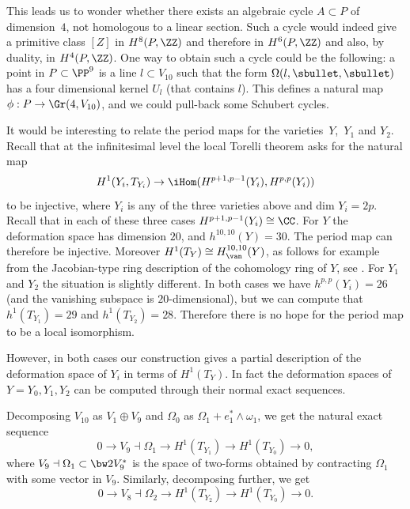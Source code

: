 This leads us to wonder whether there exists an algebraic cycle $A \subset P$ of dimension~$4$, not homologous to a linear section. Such a cycle would indeed give a primitive class
$[Z]$ in $H^8(P,\ZZ)$ and therefore in $H^6(P,\ZZ)$ and also, by duality, in $H^4(P,\ZZ)$.
One way to obtain such a cycle could be the following: a point in $P \subset \PP^9$ is a line
$l \subset V_{10}$ such that the form $\Omega(l,\sbullet,\sbullet)$ has a four dimensional
kernel $U_l$ (that contains $l$). This defines a natural map $\phi: P \to \Gr(4,V_{10})$,
and we could pull-back some Schubert cycles.

\begin{remark}
It would be interesting to relate the period maps for the varieties~$Y$,~$Y_1$ and $Y_2$.
Recall that at the infinitesimal level the local Torelli theorem asks for the natural map\vspace*{-3pt}
\[
 H^1(Y_i, T_{Y_i}) \to \iHom(H^{p+1, p-1}(Y_i), H^{p,p}(Y_i))
\]
to be injective, where $Y_i$ is any of the three varieties above and dim $Y_i=2p$. Recall that in each of these three cases $H^{p+1, p-1}(Y_i) \cong \CC$. For $Y$ the deformation space has dimension $20$, and $h^{10,10}(Y)=30$. The period map can therefore be injective. Moreover $H^1(T_Y) \cong H^{10,10}_{\van}(Y)$, as follows for example from the Jacobian-type ring description of the cohomology ring of $Y$, see \cite{eg2}. For $Y_1$ and $Y_2$ the situation is slightly different. In both cases we have $h^{p,p}(Y_i)=26$ (and the vanishing subspace is $20$-dimensional), but we can compute that $h^1(T_{Y_1})=29$ and $h^1(T_{Y_2})=28$. Therefore there is no hope for the period map to be a local isomorphism.

However, in both cases our construction gives a partial description of the deformation space of $Y_i$ in terms of $H^1(T_Y)$.
In fact the deformation spaces of $Y=Y_0, Y_1, Y_2$ can be computed through their normal
exact sequences.

Decomposing $V_{10}$ as $V_1\oplus V_9$ and $\Omega_0$ as $\Omega_1+e_1^*\wedge\omega_1$,
we get the natural exact sequence\vspace*{-3pt}
\[
0\to V_9\dashv\Omega_1\to H^1(T_{Y_1})\to H^1(T_{Y_0})\to 0,
\]
where $V_9\dashv\Omega_1\subset \bw2V_{9}^*$ is the space of two-forms obtained by contracting
$\Omega_1$ with some vector in $V_9$.
Similarly, decomposing further, we get\vspace*{-3pt}
\[
0\to V_8\dashv\Omega_2\to H^1(T_{Y_2})\to H^1(T_{Y_0})\to 0.
\]
\end{remark}

